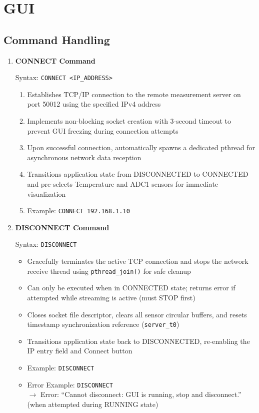 

\section{GUI} 

\subsection{Command Handling}
\begin{enumerate}
    \item \textbf{CONNECT Command}

    Syntax: \texttt{CONNECT <IP\_ADDRESS>}

    \begin{enumerate}
        \item Establishes TCP/IP connection to the remote measurement server on port 50012 using the specified IPv4 address
        \item Implements non-blocking socket creation with 3-second timeout to prevent GUI freezing during connection attempts
        \item Upon successful connection, automatically spawns a dedicated pthread for asynchronous network data reception
        \item Transitions application state from DISCONNECTED to CONNECTED and pre-selects Temperature and ADC1 sensors for immediate visualization
        \item Example: \texttt{CONNECT 192.168.1.10}
    \end{enumerate}

    \item \textbf{DISCONNECT Command}

    Syntax: \texttt{DISCONNECT}

    \begin{itemize}
        \item Gracefully terminates the active TCP connection and stops the network receive thread using \texttt{pthread\_join()} for safe cleanup
        \item Can only be executed when in CONNECTED state; returns error if attempted while streaming is active (must STOP first)
        \item Closes socket file descriptor, clears all sensor circular buffers, and resets timestamp synchronization reference (\texttt{server\_t0})
        \item Transitions application state back to DISCONNECTED, re-enabling the IP entry field and Connect button
        \item Example: \texttt{DISCONNECT}
        \item Error Example: \texttt{DISCONNECT} \\
        \(\rightarrow\) Error: ``Cannot disconnect: GUI is running, stop and disconnect.'' \\
        (when attempted during RUNNING state)
    \end{itemize}


\end{enumerate}
